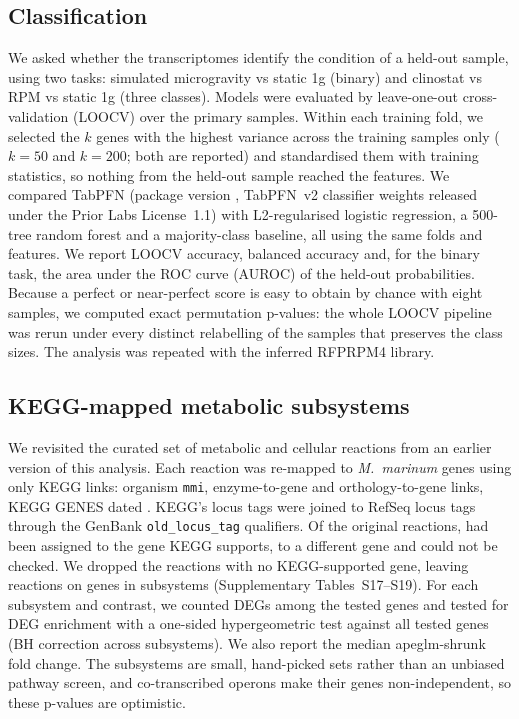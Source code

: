 \subsection*{Classification}
We asked whether the transcriptomes identify the condition of a held-out sample, using two tasks: simulated microgravity vs static 1g (binary) and clinostat vs RPM vs static 1g (three classes). Models were evaluated by leave-one-out cross-validation (LOOCV) over the \nPrimary{} primary samples. Within each training fold, we selected the $k$ genes with the highest variance across the training samples only ($k=50$ and $k=200$; both are reported) and standardised them with training statistics, so nothing from the held-out sample reached the features. We compared TabPFN\cite{hollmann2025accurate} (package version \tabpfnVersion, TabPFN~v2 classifier weights released under the Prior Labs License~1.1) with L2-regularised logistic regression, a 500-tree random forest and a majority-class baseline, all using the same folds and features. We report LOOCV accuracy, balanced accuracy and, for the binary task, the area under the ROC curve (AUROC) of the held-out probabilities. Because a perfect or near-perfect score is easy to obtain by chance with eight samples, we computed exact permutation p-values: the whole LOOCV pipeline was rerun under every distinct relabelling of the samples that preserves the class sizes. The analysis was repeated with the inferred RFPRPM4 library.

\subsection*{KEGG-mapped metabolic subsystems}
We revisited the curated set of metabolic and cellular reactions from an earlier version of this analysis. Each reaction was re-mapped to \textit{M.~marinum} genes using only KEGG links: organism \texttt{mmi}, enzyme-to-gene and orthology-to-gene links, KEGG GENES dated \keggGenesDate. KEGG's locus tags were joined to RefSeq locus tags through the GenBank \texttt{old\_locus\_tag} qualifiers. Of the \keggOldReactions{} original reactions, \keggOldCorrect{} had been assigned to the gene KEGG supports, \keggOldWrong{} to a different gene and \keggOldUnverifiable{} could not be checked. We dropped the \keggDropped{} reactions with no KEGG-supported gene, leaving \keggReactions{} reactions on \keggGenes{} genes in \keggSubsystems{} subsystems (Supplementary Tables~S17--S19). For each subsystem and contrast, we counted DEGs among the tested genes and tested for DEG enrichment with a one-sided hypergeometric test against all tested genes (BH correction across subsystems). We also report the median apeglm-shrunk fold change. The subsystems are small, hand-picked sets rather than an unbiased pathway screen, and co-transcribed operons make their genes non-independent, so these p-values are optimistic.

